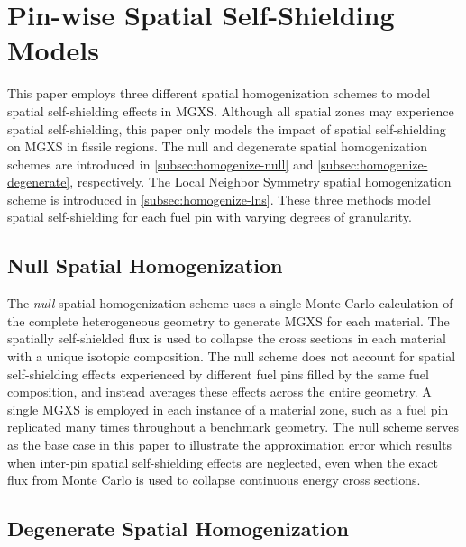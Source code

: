 \section{Pin-wise Spatial Self-Shielding Models}
\label{sec:pin-wise-shielding}

This paper employs three different spatial homogenization schemes to model spatial self-shielding effects in MGXS. Although all spatial zones may experience spatial self-shielding, this paper only models the impact of spatial self-shielding on MGXS in fissile regions. The null and degenerate spatial homogenization schemes are introduced in \autoref{subsec:homogenize-null} and \autoref{subsec:homogenize-degenerate}, respectively. The Local Neighbor Symmetry spatial homogenization scheme is introduced in \autoref{subsec:homogenize-lns}. These three methods model spatial self-shielding for each fuel pin with varying degrees of granularity.


\subsection{Null Spatial Homogenization}
\label{subsec:homogenize-null}

The \textit{null} spatial homogenization scheme uses a single Monte Carlo calculation of the complete heterogeneous geometry to generate MGXS for each material. The spatially self-shielded flux is used to collapse the cross sections in each material with a unique isotopic composition. The null scheme does not account for spatial self-shielding effects experienced by different fuel pins filled by the same fuel composition, and instead averages these effects across the entire geometry. A single MGXS is employed in each instance of a material zone, such as a fuel pin replicated many times throughout a benchmark geometry. The null scheme serves as the base case in this paper to illustrate the approximation error which results when inter-pin spatial self-shielding effects are neglected, even when the exact flux from Monte Carlo is used to collapse continuous energy cross sections.


\subsection{Degenerate Spatial Homogenization}
\label{subsec:homogenize-degenerate}

